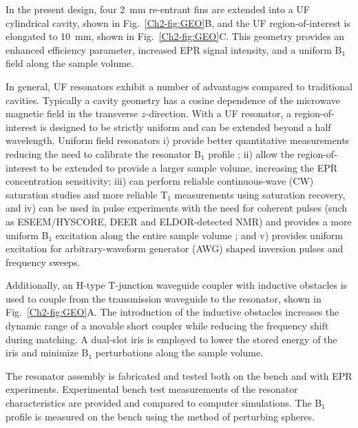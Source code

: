In the present design, four 2~mm re-entrant fins are extended into a UF cylindrical \cylTE{} cavity, shown in Fig.~\ref{Ch2-fig:GEO}B, and the UF region-of-interest is elongated to 10~mm, shown in Fig.~\ref{Ch2-fig:GEO}C. This geometry provides an enhanced efficiency parameter, increased EPR signal intensity, and a uniform B$_1$ field along the sample volume.

In general, UF resonators exhibit a number of advantages compared to traditional cavities. Typically a cavity geometry has a cosine dependence of the microwave magnetic field in the transverse $z$-direction. With a UF resonator, a region-of-interest is designed to be strictly uniform and can be extended beyond a half wavelength. Uniform field resonators i) provide better quantitative measurements reducing the need to calibrate the resonator B$_1$ profile \cite{eaton2010quantitative}; ii) allow the region-of-interest to be extended to provide a larger sample volume, increasing the EPR concentration sensitivity; iii) can perform reliable continuous-wave (CW) saturation studies \cite{klugsdsl} and more reliable T$_1$ measurements using saturation recovery, and  iv) can be used in pulse experiments with the need for coherent pulses (such as ESEEM/HYSCORE, DEER and ELDOR-detected NMR) and provides a more uniform B$_1$ excitation along the entire sample volume \cite{pulsejeschke, COX201763}; and v) provides uniform excitation for arbitrary-waveform generator (AWG) shaped inversion pulses \cite{stollshaped, shapedpulse} and frequency sweeps. \cite{DOLL201746}

Additionally, an H-type T-junction waveguide coupler with inductive obstacles is used to couple from the transmission waveguide to the resonator, shown in Fig.~\ref{Ch2-fig:GEO}A. The introduction of the inductive obstacles increases the dynamic range of a movable short coupler while reducing the frequency shift during matching. A dual-slot iris is employed to lower the stored energy of the iris and minimize B$_1$ perturbations along the sample volume. \cite{UFLGR2017}

The resonator assembly is fabricated and tested both on the bench and with EPR experiments. Experimental bench test measurements of the resonator characteristics are provided and compared to computer simulations. The B$_1$ profile is measured on the bench using the method of perturbing spheres. 

